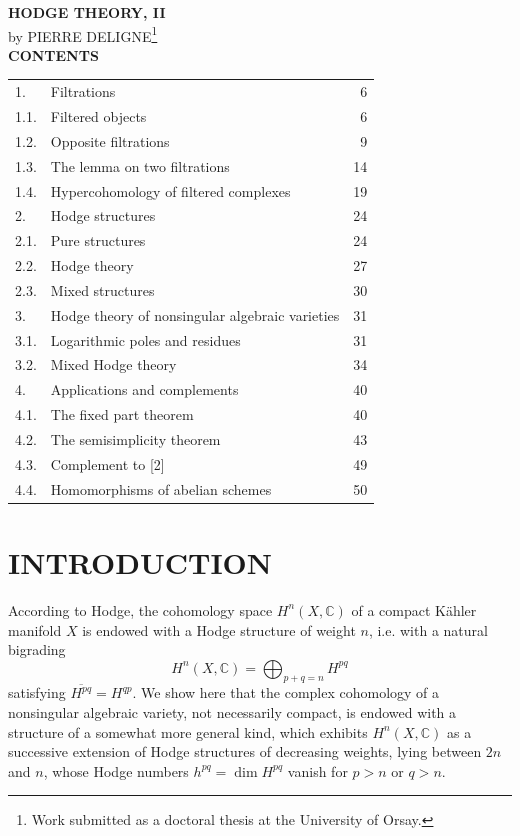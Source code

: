 \documentclass[10pt]{article}
\newcommand{\C}{\mathbb C}
\newcommand{\fg}{\guillemotright}
\newcommand{\og}{\guillemotleft}
\begin{document}
\begin{center}
{\Large\bfseries HODGE THEORY, II}\\[0.4em]
{\normalsize by PIERRE DELIGNE{\renewcommand{\thefootnote}{(\arabic{footnote})}\footnote{Work submitted as a doctoral thesis at the University of Orsay.}}}\\[1.3em]
{\bfseries CONTENTS}
\end{center}

\begin{center}
\begin{tabular}{llr}
1. & Filtrations & 6\\
1.1. & Filtered objects & 6\\
1.2. & Opposite filtrations & 9\\
1.3. & The lemma on two filtrations & 14\\
1.4. & Hypercohomology of filtered complexes & 19\\
2. & Hodge structures & 24\\
2.1. & Pure structures & 24\\
2.2. & Hodge theory & 27\\
2.3. & Mixed structures & 30\\
3. & Hodge theory of nonsingular algebraic varieties & 31\\
3.1. & Logarithmic poles and residues & 31\\
3.2. & Mixed Hodge theory & 34\\
4. & Applications and complements & 40\\
4.1. & The fixed part theorem & 40\\
4.2. & The semisimplicity theorem & 43\\
4.3. & Complement to [2] & 49\\
4.4. & Homomorphisms of abelian schemes & 50
\end{tabular}
\end{center}

\section*{INTRODUCTION}

According to Hodge, the cohomology space $H^n(X,\C)$ of a compact Kähler manifold $X$ is endowed with a \og Hodge structure\fg{} of weight $n$, i.e. with a natural bigrading
\[
H^n(X,\C)=\bigoplus_{p+q=n}H^{pq}
\]
satisfying $\overline{H^{pq}}=H^{qp}$. We show here that the complex cohomology of a nonsingular algebraic variety, not necessarily compact, is endowed with a structure of a somewhat more general kind, which exhibits $H^n(X,\C)$ as a \og successive extension\fg{} of Hodge structures of decreasing weights, lying between $2n$ and $n$, whose Hodge numbers $h^{pq}=\dim H^{pq}$ vanish for $p>n$ or $q>n$.
\end{document}
